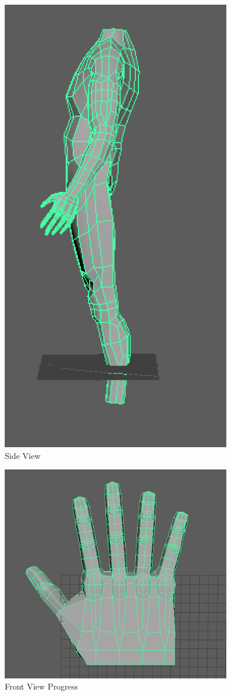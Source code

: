 \documentclass[a4paper]{article}
\begin{document}
\begin{figure}[h]
\centering
\includegraphics[width=10cm]{img/Side.png}
\caption{Side View}
\label{fig:Side View}
\end{figure}


\begin{figure}[h]
\centering
\includegraphics[width=10cm]{img/Front1.png}
\caption{Front View Progress}
\label{fig:Front View}
\end{figure}
\end{document}
